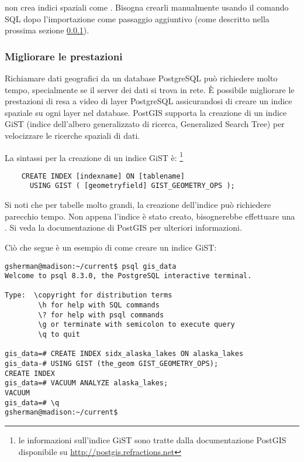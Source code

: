  non crea indici spaziali come . Bisogna
crearli manualmente usando il comando SQL  dopo
l'importazione come passaggio aggiuntivo (come descritto nella prossima
sezione \ref{label_improve}).

\subsubsection{Migliorare le prestazioni} \label{label_improve}

Richiamare dati geografici da un database PostgreSQL può richiedere molto
tempo, specialmente se il server dei dati si trova in rete. È possibile
migliorare le prestazioni di resa a video di layer PostgreSQL assicurandosi
di creare un  indice spaziale su ogni layer nel
database. PostGIS supporta la creazione di un  indice GiST
(indice dell'albero generalizzato di ricerca, Generalized Search Tree) per
velocizzare le ricerche spaziali di dati.

La sintassi per la creazione di un indice GiST è:
\footnote{le informazioni sull'indice GiST
sono tratte dalla documentazione PostGIS disponibile su \url{http://postgis.refractions.net}}

\begin{verbatim}
    CREATE INDEX [indexname] ON [tablename] 
      USING GIST ( [geometryfield] GIST_GEOMETRY_OPS );
\end{verbatim}

Si noti che per tabelle molto grandi, la creazione dell'indice può richiedere
parecchio tempo. Non appena l'indice è stato creato, bisognerebbe effettuare
una . Si veda la documentazione di PostGIS
\cite{PostGISweb} per ulteriori informazioni.

Ciò che segue è un esempio di come creare un indice GiST:
\begin{verbatim}
gsherman@madison:~/current$ psql gis_data
Welcome to psql 8.3.0, the PostgreSQL interactive terminal.

Type:  \copyright for distribution terms
        \h for help with SQL commands
        \? for help with psql commands
        \g or terminate with semicolon to execute query
        \q to quit

gis_data=# CREATE INDEX sidx_alaska_lakes ON alaska_lakes
gis_data-# USING GIST (the_geom GIST_GEOMETRY_OPS);
CREATE INDEX
gis_data=# VACUUM ANALYZE alaska_lakes;
VACUUM
gis_data=# \q
gsherman@madison:~/current$
\end{verbatim}

